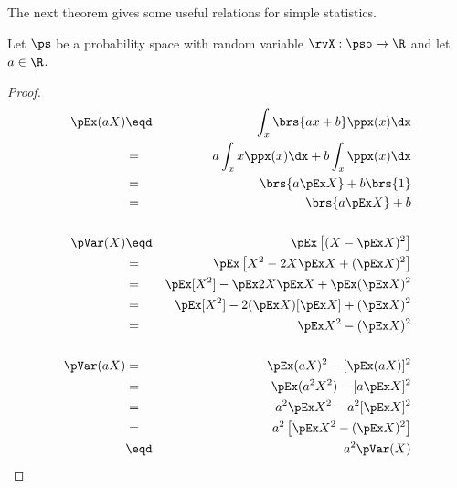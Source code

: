 The next theorem gives some useful relations for simple statistics.
\begin{theorem}
\label{thm:pE}
Let $\ps$ be a probability space with random variable $\rvX:\pso\to\R$
and let $a\in\R$.
\end{theorem}
\begin{proof}
\begin{eqnarray*}
  \pEx(aX)
    &\eqd& \int_x \brs{ax+b} \ppx(x)  \dx
  \\&=&    a \int_x x \ppx(x)  \dx + b\int_x \ppx(x)  \dx
  \\&=& \brs{a\pEx X} + b\brs{1}
  \\&=& \brs{a\pEx X} + b
\\
\\
  \pVar(X)
    &\eqd& \pEx\left[(X-\pEx X)^2\right]
  \\&=&    \pEx\left[X^2-2X\pEx X + (\pEx X)^2 \right]
  \\&=&    \pEx[X^2]  - \pEx 2X\pEx X  + \pEx (\pEx X)^2
  \\&=&    \pEx[X^2] - 2(\pEx X)[\pEx X] + (\pEx X)^2
  \\&=&    \pEx X^2  - (\pEx X)^2
\\
\\
  \pVar(aX)
    &=&    \pEx(aX)^2  - [\pEx(aX)]^2
  \\&=&    \pEx(a^2X^2)  - [a\pEx X]^2
  \\&=&    a^2 \pEx X^2  - a^2[\pEx X]^2
  \\&=&    a^2\left[ \pEx X^2  - (\pEx X)^2 \right]
  \\&\eqd& a^2 \pVar(X)
\end{eqnarray*}
\end{proof}


